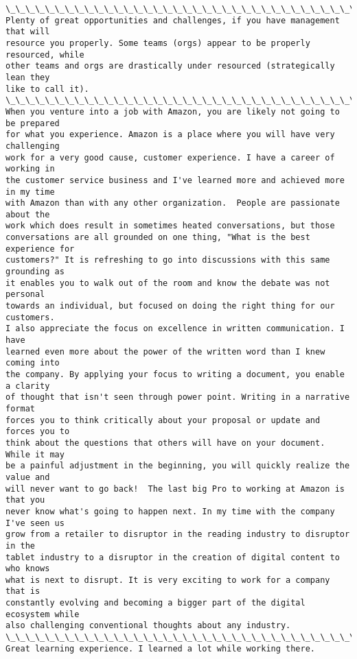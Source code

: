\documentclass[11pt]{article}
\begin{document}
\begin{Verbatim}[commandchars=\\\{\}]
\_\_\_\_\_\_\_\_\_\_\_\_\_\_\_\_\_\_\_\_\_\_\_\_\_\_\_\_\_\_\_\_\_\_\_\_\_\_\_\_\_\_\_\_\_\_\_\_\_\_\_\_\_\_\_\_\_\_\_\_\_\_\_\_\_\_\_\_\_\_
Plenty of great opportunities and challenges, if you have management that will
resource you properly. Some teams (orgs) appear to be properly resourced, while
other teams and orgs are drastically under resourced (strategically lean they
like to call it).
\_\_\_\_\_\_\_\_\_\_\_\_\_\_\_\_\_\_\_\_\_\_\_\_\_\_\_\_\_\_\_\_\_\_\_\_\_\_\_\_\_\_\_\_\_\_\_\_\_\_\_\_\_\_\_\_\_\_\_\_\_\_\_\_\_\_\_\_\_\_
When you venture into a job with Amazon, you are likely not going to be prepared
for what you experience. Amazon is a place where you will have very challenging
work for a very good cause, customer experience. I have a career of working in
the customer service business and I've learned more and achieved more in my time
with Amazon than with any other organization.  People are passionate about the
work which does result in sometimes heated conversations, but those
conversations are all grounded on one thing, "What is the best experience for
customers?" It is refreshing to go into discussions with this same grounding as
it enables you to walk out of the room and know the debate was not personal
towards an individual, but focused on doing the right thing for our customers.
I also appreciate the focus on excellence in written communication. I have
learned even more about the power of the written word than I knew coming into
the company. By applying your focus to writing a document, you enable a clarity
of thought that isn't seen through power point. Writing in a narrative format
forces you to think critically about your proposal or update and forces you to
think about the questions that others will have on your document. While it may
be a painful adjustment in the beginning, you will quickly realize the value and
will never want to go back!  The last big Pro to working at Amazon is that you
never know what's going to happen next. In my time with the company I've seen us
grow from a retailer to disruptor in the reading industry to disruptor in the
tablet industry to a disruptor in the creation of digital content to who knows
what is next to disrupt. It is very exciting to work for a company that is
constantly evolving and becoming a bigger part of the digital ecosystem while
also challenging conventional thoughts about any industry.
\_\_\_\_\_\_\_\_\_\_\_\_\_\_\_\_\_\_\_\_\_\_\_\_\_\_\_\_\_\_\_\_\_\_\_\_\_\_\_\_\_\_\_\_\_\_\_\_\_\_\_\_\_\_\_\_\_\_\_\_\_\_\_\_\_\_\_\_\_\_
Great learning experience. I learned a lot while working there.

\end{Verbatim}
\end{document}
